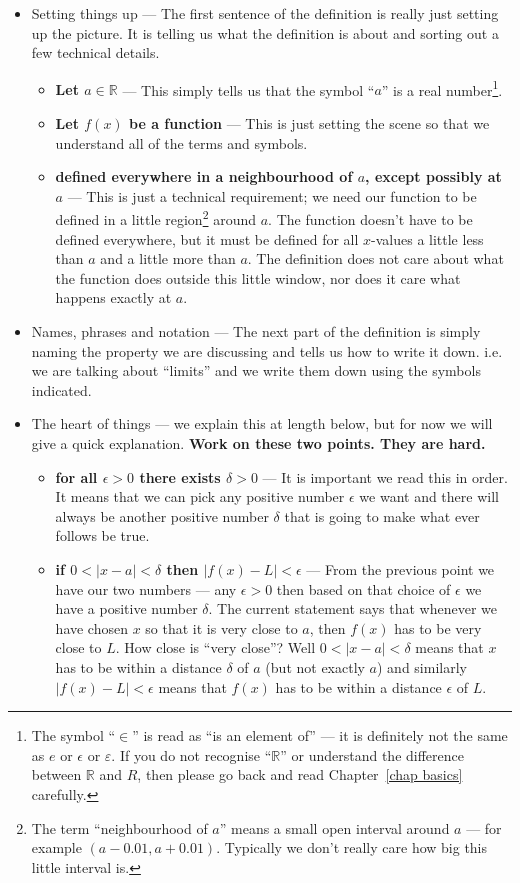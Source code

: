 \begin{itemize}
 \item Setting things up --- The first sentence of the definition is really
just setting up the picture. It is telling us what the definition is about and
sorting out a few technical details.
\begin{itemize}
 \item \textbf{Let $a \in \mathbb{R}$} --- This simply tells us that the symbol
``$a$'' is a real number\footnote{The symbol ``$\in$'' is read as ``is an
element of'' --- it is definitely not the same as $e$ or $\epsilon$ or
$\varepsilon$. If you do not recognise ``$\mathbb{R}$'' or understand the
difference between $\mathbb{R}$ and $R$, then please go back and read Chapter~\ref{chap
basics} carefully.}.
 \item \textbf{Let $f(x)$ be a function} --- This is just setting the scene so
that we understand all of the terms and symbols.
 \item \textbf{defined everywhere in a neighbourhood of $a$, except possibly at
$a$} --- This is just a technical requirement; we need our function to be
defined in a little region\footnote{The term ``neighbourhood of $a$'' means a
small open interval around $a$ --- for example $(a-0.01, a+0.01)$. Typically
we don't really care how big this little interval is.} around $a$. The
function doesn't have to be defined everywhere, but it must be defined for all
$x$-values a little less than $a$ and a little more than $a$. The definition
does not care about what the function does outside this little window, nor does
it care what happens exactly at $a$.
\end{itemize}
\item Names, phrases and notation --- The next part of the definition is simply
naming the property we are discussing and tells us how to write it down. i.e. we
are talking about ``limits'' and we write them down using the symbols
indicated.
\item The heart of things --- we explain this at length below, but for now we
will give a quick explanation. \textbf{Work on these two points. They are hard.}
  \begin{itemize}
   \item \textbf{for all $\epsilon>0$ there exists $\delta >0$} --- It is
important we read this in order. It means that we can pick any positive number
$\epsilon$ we want and there will always be another positive number $\delta$
that is going to make what ever follows be true.
   \item \textbf{if $0<|x-a|<\delta$ then $|f(x)-L|<\epsilon$} --- From the
previous point we have our two numbers --- any $\epsilon >0$ then based on that
choice of $\epsilon$ we have a positive number $\delta$. The current statement
says that whenever we have chosen $x$ so that it is very close to $a$, then
$f(x)$ has to be very close to $L$. How close is ``very close''? Well
$0<|x-a|<\delta$ means that $x$ has to be within a distance $\delta$ of $a$
(but not exactly $a$) and similarly $|f(x)-L|<\epsilon$ means that $f(x)$ has
to
be within a distance $\epsilon$ of $L$.
  \end{itemize}
\end{itemize}
